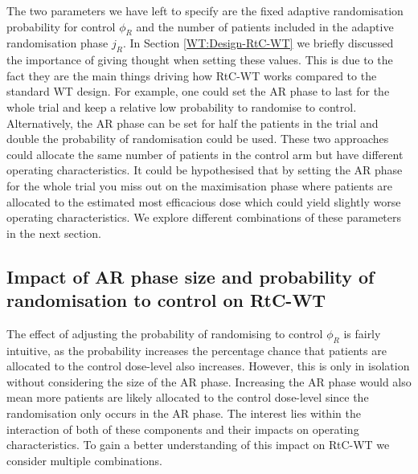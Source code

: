 The two parameters we have left to specify are the fixed adaptive randomisation probability for control $\phi_R$ and the number of patients included in the adaptive randomisation phase $j_R$. In Section \ref{WT:Design-RtC-WT} we briefly discussed the importance of giving thought when setting these values. This is due to the fact they are the main things driving how RtC-WT works compared to the standard WT design. For example, one could set the AR phase to last for the whole trial and keep a relative low probability to randomise to control. Alternatively, the AR phase can be set for half the patients in the trial and double the probability of randomisation could be used. These two approaches could allocate the same number of patients in the control arm but have different operating characteristics. It could be hypothesised that by setting the AR phase for the whole trial you miss out on the maximisation phase where patients are allocated to the estimated most efficacious dose which could yield slightly worse operating characteristics. We explore different combinations of these parameters in the next section. 


\subsection{Impact of AR phase size and probability of randomisation to control on RtC-WT}
\label{WT:Impact-ARandRTCon-RtC-WT}


The effect of adjusting the probability of randomising to control $\phi_R$ is fairly intuitive, as the probability increases the percentage chance that patients are allocated to the control dose-level also increases. However, this is only in isolation without considering the size of the AR phase. Increasing the AR phase would also mean more patients are likely allocated to the control dose-level since the randomisation only occurs in the AR phase. The interest lies within the interaction of both of these components and their impacts on operating characteristics. To gain a better understanding of this impact on RtC-WT we consider multiple combinations. 

